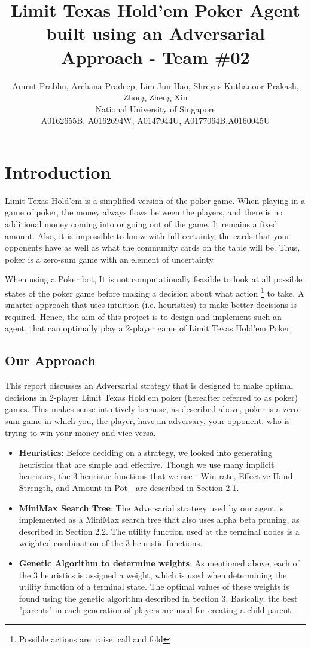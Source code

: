 \documentclass{article}
\title{Limit Texas Hold'em Poker Agent built using an Adversarial Approach - Team \#02}
\author{
Amrut Prabhu,
Archana Pradeep,
Lim Jun Hao,
Shreyas Kuthanoor Prakash,
Zhong Zheng Xin
\\ 
National University of Singapore\\
A0162655B, A0162694W, A0147944U, A0177064B,A0160045U 
}
\begin{document}
\maketitle

\section{Introduction}

Limit Texas Hold’em is a simplified version of the poker game. When playing in a game of poker,  the money always flows between the players, and there is no additional money coming into or going out of the game. It remains a fixed amount. Also, it is impossible to know with full certainty, the cards that your opponents have as well as what the community cards on the table will be. Thus, poker is a zero-sum game with an element of uncertainty. 

When using a Poker bot, It is not computationally feasible to look at all possible states of the poker game before making a decision about what action \footnote{Possible actions are: raise, call and fold} to take. A smarter approach that uses intuition (i.e. heuristics) to make better decisions is required. Hence, the aim of this project is to design and implement such an agent, that can optimally play a 2-player game of Limit Texas Hold’em Poker.

\subsection{Our Approach} 

This report discusses an Adversarial strategy that is designed to make optimal decisions in 2-player Limit Texas Hold’em poker (hereafter referred to as poker) games. This makes sense intuitively because, as described above, poker is a zero-sum game in which you, the player, have an adversary, your opponent, who is trying to win your money and vice versa.

\begin{itemize}
    \item {\bf Heuristics}:
        Before deciding on a strategy, we looked into generating heuristics that are simple and effective. Though we use many implicit heuristics, the 3 heuristic functions that we use - Win rate, Effective Hand Strength, and Amount in Pot - are described in Section 2.1.
    \item {\bf MiniMax Search Tree}:
        The Adversarial strategy used by our agent is implemented as a MiniMax search tree that also uses alpha beta pruning, as described in Section 2.2. The utility function used at the terminal nodes is a weighted combination of the 3 heuristic functions. 
    \item {\bf Genetic Algorithm to determine weights}:
        As mentioned above, each of the 3 heuristics is assigned a weight, which is used when determining the utility function of a terminal state. The optimal values of these weights is found using the genetic algorithm described in Section 3. Basically, the best "parents" in each generation of players are used for creating a child parent.
\end{itemize}
\end{document}
